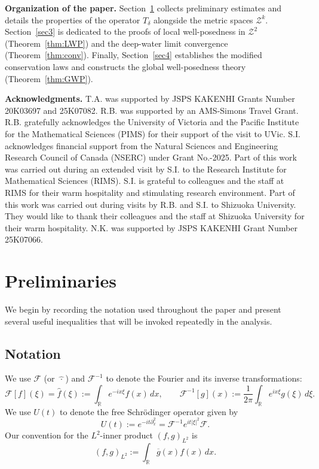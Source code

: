 \documentclass{amsart}
\numberwithin{equation}{section}
\newcommand{\R}{\mathbb{R}}
\begin{document}
\medskip
\noindent\textbf{Organization of the paper.} 
Section~\ref{sec2} collects preliminary estimates and details the properties of the operator $T_\delta$ alongside the metric spaces $\mathcal{Z}^k$. Section~\ref{sec3} is dedicated to the proofs of local well-posedness in $\mathcal{Z}^2$ (Theorem~\ref{thm:LWP}) and the deep-water limit convergence (Theorem~\ref{thm:conv}). 
Finally, Section~\ref{sec4} establishes the modified conservation laws and constructs the global well-posedness theory (Theorem~\ref{thm:GWP}).


\medskip
{\large \textbf{Acknowledgments.}}
T.A. was supported by JSPS KAKENHI Grants Number 20K03697 and 25K07082. 
R.B. was supported by an AMS-Simons Travel Grant. 
R.B. gratefully acknowledges the University of Victoria and the Pacific Institute for the Mathematical Sciences (PIMS) for their support of the visit to UVic. 
S.I. acknowledges financial support from the Natural Sciences and Engineering Research Council of Canada (NSERC) under Grant No.-2025. 
Part of this work was carried out during an extended visit by S.I. to the Research Institute for Mathematical Sciences (RIMS). 
S.I. is grateful to colleagues and the staff at RIMS for their warm hospitality and stimulating research environment.
Part of this work was carried out during visits by R.B. and S.I. to Shizuoka University. 
They would like to thank their colleagues and the staff at Shizuoka University for their warm hospitality.
N.K. was supported by JSPS KAKENHI Grant Number 25K07066.





\section{Preliminaries}
\label{sec2}

We begin by recording the notation used throughout the paper and present several useful inequalities that will be invoked repeatedly in the analysis.

\subsection{Notation}
\label{subsec:notation}

We use $\mathcal{F}$ (or $\widehat{\,\cdot\,}$) and $\mathcal{F}^{-1}$ to denote the Fourier and its inverse transformations:
\[ \mathcal{F}[f](\xi)=\widehat{f}(\xi) :=\int_{\R}e^{-ix\xi}f(x)\,dx,\qquad \mathcal{F}^{-1}[g](x):=\frac1{2\pi}\int_{\R}e^{ix\xi}g(\xi)\,d\xi .\]
We use $U(t)$ to denote the free Schr\"odinger operator given by
\[ U(t):=e^{-it\partial_x^2}=\mathcal{F}^{-1}e^{it|\xi|^2}\mathcal{F}. \]
Our convention for the $L^2$-inner product $\left( f,g\right)_{L^2}$ is
\[ \left( f,g\right)_{L^2} :=\int_\R \overline{g}(x)  f(x) \, dx. \]
\end{document}
